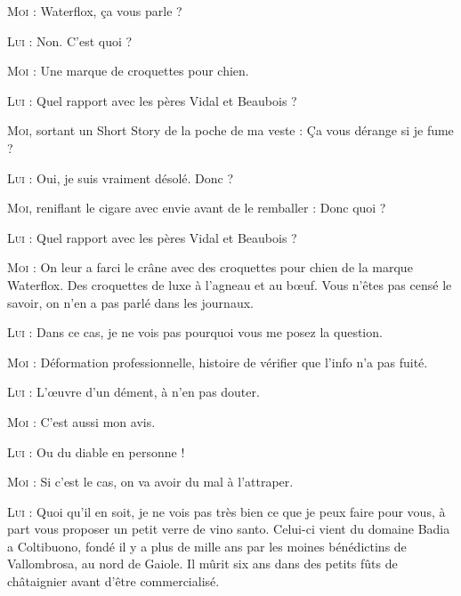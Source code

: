 \begin{dialogue}

\textsc{Moi} : Waterflox, ça vous parle ?

\textsc{Lui} : Non. C’est quoi ?

\textsc{Moi} : Une marque de croquettes pour chien.

\textsc{Lui} : Quel rapport avec les pères Vidal et Beaubois ?

\textsc{Moi}, sortant un Short Story de la poche de ma veste : Ça vous dérange si je fume ?

\textsc{Lui} : Oui, je suis vraiment désolé. Donc ?

\textsc{Moi}, reniflant le cigare avec envie avant de le remballer : Donc quoi ?

\textsc{Lui} : Quel rapport avec les pères Vidal et Beaubois ?

\textsc{Moi} : On leur a farci le crâne avec des croquettes pour chien de la marque Waterflox. Des croquettes de luxe à l’agneau et au bœuf. Vous n’êtes pas censé le savoir, on n’en a pas parlé dans les journaux.

\textsc{Lui} : Dans ce cas, je ne vois pas pourquoi vous me posez la question.

\textsc{Moi} : Déformation professionnelle, histoire de vérifier que l’info n’a pas fuité.

\textsc{Lui} : L’œuvre d’un dément, à n’en pas douter.

\textsc{Moi} : C’est aussi mon avis.

\textsc{Lui} : Ou du diable en personne !

\textsc{Moi} : Si c’est le cas, on va avoir du mal à l’attraper.

\textsc{Lui} : Quoi qu’il en soit, je ne vois pas très bien ce que je peux faire pour vous, à part vous proposer un petit verre de vino santo. Celui-ci vient du domaine Badia a Coltibuono, fondé il y a plus de mille ans par les moines bénédictins de Vallombrosa, au nord de Gaiole. Il mûrit six ans dans des petits fûts de châtaignier avant d’être commercialisé.


\end{dialogue}
